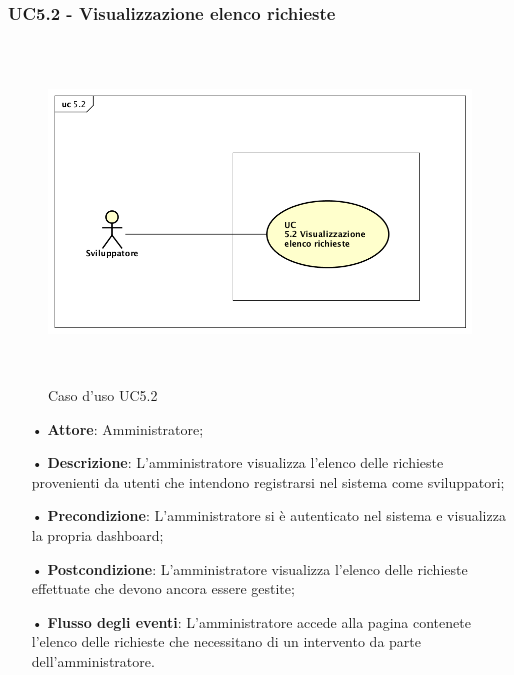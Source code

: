 \subsubsection{UC5.2 - Visualizzazione elenco richieste}

\begin{figure}[H]
\centering
\includegraphics[height=9cm, width=17cm]{img/UC52.png} 
\caption{Caso d'uso UC5.2}
\end{figure}


\begin{itemize}
\item[•] \textbf{Attore}: Amministratore;

\item[•] \textbf{Descrizione}: L'amministratore visualizza l'elenco delle richieste provenienti da utenti che intendono registrarsi nel sistema come sviluppatori;

\item[•] \textbf{Precondizione}: L'amministratore si è autenticato nel sistema e visualizza la propria dashboard;

\item[•] \textbf{Postcondizione}: L'amministratore visualizza l'elenco delle richieste effettuate che devono ancora essere gestite;

\item[•] \textbf{Flusso degli eventi}: L'amministratore accede alla pagina contenete l'elenco delle richieste che necessitano di un intervento da parte dell'amministratore.
\end{itemize}

